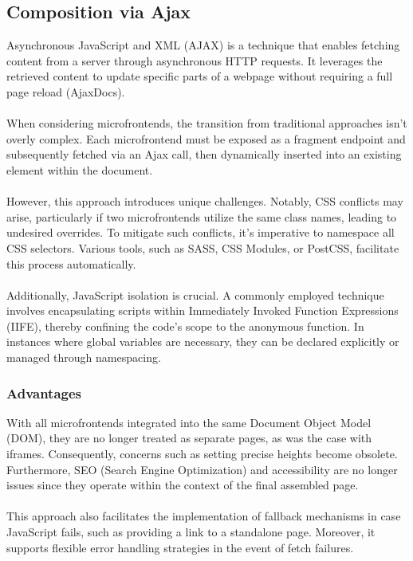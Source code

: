 \subsection{Composition via Ajax}
Asynchronous JavaScript and XML (AJAX) is a technique that enables fetching content from a server through asynchronous HTTP requests. It leverages the retrieved content to update specific parts of a webpage without requiring a full page reload (AjaxDocs).\cite{AjaxDocs} \\\\
When considering microfrontends, the transition from traditional approaches isn't overly complex. Each microfrontend must be exposed as a fragment endpoint and subsequently fetched via an Ajax call, then dynamically inserted into an existing element within the document. \\\\
However, this approach introduces unique challenges. Notably, CSS conflicts may arise, particularly if two microfrontends utilize the same class names, leading to undesired overrides. To mitigate such conflicts, it's imperative to namespace all CSS selectors. Various tools, such as SASS, CSS Modules, or PostCSS, facilitate this process automatically.\\\\
Additionally, JavaScript isolation is crucial. A commonly employed technique involves encapsulating scripts within Immediately Invoked Function Expressions (IIFE), thereby confining the code's scope to the anonymous function. In instances where global variables are necessary, they can be declared explicitly or managed through namespacing. \cite{MicrofrontendsInAction}

\subsubsection{Advantages}
With all microfrontends integrated into the same Document Object Model (DOM), they are no longer treated as separate pages, as was the case with iframes. Consequently, concerns such as setting precise heights become obsolete. Furthermore, SEO (Search Engine Optimization) and accessibility are no longer issues since they operate within the context of the final assembled page. \\\\
This approach also facilitates the implementation of fallback mechanisms in case JavaScript fails, such as providing a link to a standalone page. Moreover, it supports flexible error handling strategies in the event of fetch failures. \cite{MicrofrontendsInAction}

